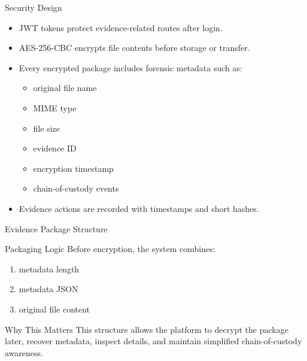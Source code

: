 \documentclass[aspectratio=169]{beamer}
\begin{document}
\begin{frame}{Security Design}
    \begin{itemize}
        \item JWT tokens protect evidence-related routes after login.
        \item AES-256-CBC encrypts file contents before storage or transfer.
        \item Every encrypted package includes forensic metadata such as:
        \begin{itemize}
            \item original file name
            \item MIME type
            \item file size
            \item evidence ID
            \item encryption timestamp
            \item chain-of-custody events
        \end{itemize}
        \item Evidence actions are recorded with timestamps and short hashes.
    \end{itemize}
\end{frame}

\begin{frame}{Evidence Package Structure}
    \begin{block}{Packaging Logic}
        Before encryption, the system combines:
    \end{block}

    \begin{enumerate}
        \item metadata length
        \item metadata JSON
        \item original file content
    \end{enumerate}

    \vspace{0.3cm}

    \begin{block}{Why This Matters}
        This structure allows the platform to decrypt the package later, recover metadata, inspect details, and maintain simplified chain-of-custody awareness.
    \end{block}
\end{frame}
\end{document}
